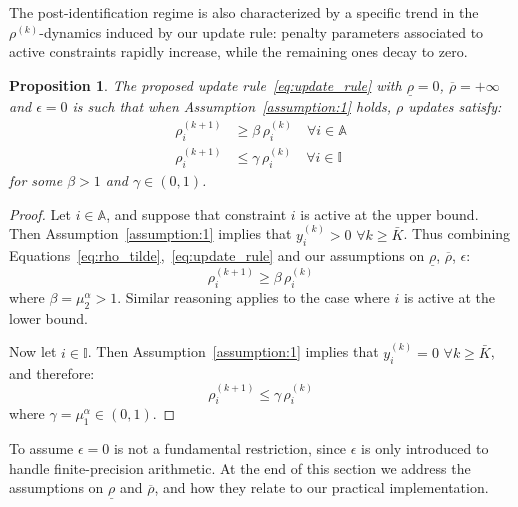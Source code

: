 \documentclass[letterpaper, 10 pt, conference]{ieeeconf}  %
\newtheorem{proposition}{Proposition}
\begin{document}
The post-identification regime is also characterized by a specific trend in the $\rho^{(k)}$-dynamics induced by our update rule: penalty parameters associated to active constraints rapidly increase, while the remaining ones decay to zero.
\begin{proposition}
\label{prop:rho_dynamics}
    The proposed update rule~\eqref{eq:update_rule} with $\underline{\rho} = 0$, $\overline{\rho} = +\infty$ and $\epsilon=0$ is such that when Assumption~\ref{assumption:1} holds, $\rho$ updates satisfy:
    \begin{equation}
    \label{eq:assumption_2}
    \begin{aligned}
        \rho_i^{(k+1)} &\ge \beta\, \rho_i^{(k)} \quad \forall i \in \mathbb{A} \\
        \rho_i^{(k+1)} &\le \gamma\, \rho_i^{(k)} \quad \forall i \in \mathbb{I}
    \end{aligned}
    \end{equation}
for some $\beta > 1$ and $\gamma \in (0, 1)$.
\end{proposition}
\begin{proof}
Let $i \in \mathbb{A}$, and suppose that constraint $i$ is active at the upper bound. Then Assumption~\ref{assumption:1} implies that $y^{(k)}_i > 0$ $\forall k \geq \bar{K}$. Thus combining Equations~\eqref{eq:rho_tilde},~\eqref{eq:update_rule} and our assumptions on $\underline{\rho}$, $\overline{\rho}$, $\epsilon$:
\begin{equation}
    \rho_i^{(k+1)} \geq \beta \,\rho_i^{(k)}
\end{equation}
where $\beta = \mu_2^\alpha > 1$. Similar reasoning applies to the case where $i$ is active at the lower bound.

Now let $i \in \mathbb{I}$. Then Assumption~\ref{assumption:1} implies that $y^{(k)}_i = 0$ $\forall k \geq \bar{K}$, and therefore:
\begin{equation}
    \rho_i^{(k+1)} \leq \gamma \, \rho_i^{(k)}
\end{equation}
where $\gamma = \mu_1^\alpha \in (0,1)$.
\end{proof}

To assume $\epsilon = 0$ is not a fundamental restriction, since $\epsilon$ is only introduced to handle finite-precision arithmetic. At the end of this section we address the assumptions on $\underline{\rho}$ and $\overline{\rho}$, and how they relate to our practical  implementation. 
\end{document}
